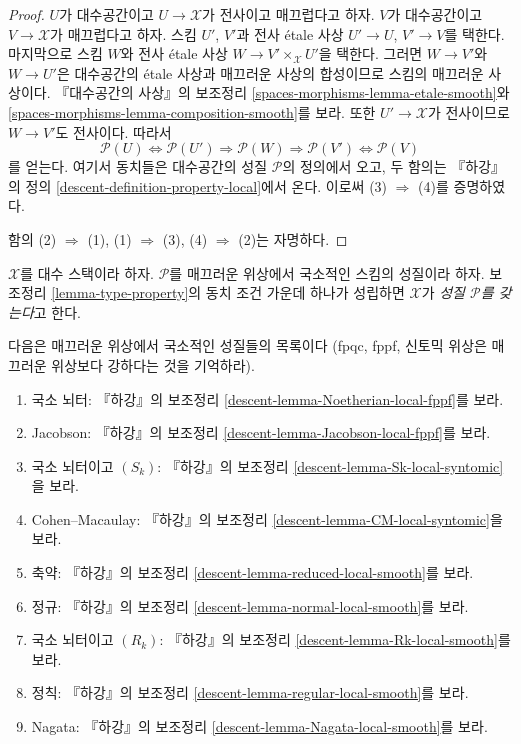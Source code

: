 \begin{proof}
$U$가 대수공간이고 $U \to \mathcal{X}$가 전사이고 매끄럽다고 하자.
$V$가 대수공간이고 $V \to \mathcal{X}$가 매끄럽다고 하자.
스킴 $U'$, $V'$과 전사 \'etale 사상
$U' \to U$, $V' \to V$를 택한다. 마지막으로 스킴 $W$와 전사
\'etale 사상 $W \to V' \times_\mathcal{X} U'$을 택한다.
그러면 $W \to V'$와 $W \to U'$은 대수공간의 \'etale 사상과
매끄러운 사상의 합성이므로 스킴의 매끄러운 사상이다.
『대수공간의 사상』의 보조정리
\ref{spaces-morphisms-lemma-etale-smooth}와
\ref{spaces-morphisms-lemma-composition-smooth}를 보라.
또한 $U' \to \mathcal{X}$가 전사이므로 $W \to V'$도 전사이다.
따라서
$$
\mathcal{P}(U) \Leftrightarrow
\mathcal{P}(U') \Rightarrow
\mathcal{P}(W) \Rightarrow
\mathcal{P}(V') \Leftrightarrow \mathcal{P}(V)
$$
를 얻는다. 여기서 동치들은 대수공간의 성질 $\mathcal{P}$의 정의에서
오고, 두 함의는 『하강』의 정의
\ref{descent-definition-property-local}에서 온다.
이로써 (3) $\Rightarrow$ (4)를 증명하였다.

\medskip\noindent
함의 (2) $\Rightarrow$ (1), (1) $\Rightarrow$ (3),
(4) $\Rightarrow$ (2)는 자명하다.
\end{proof}

\begin{definition}
\label{definition-type-property}
$\mathcal{X}$를 대수 스택이라 하자.
$\mathcal{P}$를 매끄러운 위상에서 국소적인 스킴의 성질이라 하자.
보조정리 \ref{lemma-type-property}의 동치 조건 가운데 하나가 성립하면
$\mathcal{X}$가 {\it 성질 $\mathcal{P}$를 갖는다}고 한다.
\end{definition}

\begin{remark}
\label{remark-list-properties-local-smooth-topology}
다음은 매끄러운 위상에서 국소적인 성질들의 목록이다
(fpqc, fppf, 신토믹 위상은 매끄러운 위상보다 강하다는 것을 기억하라).
\begin{enumerate}
\item 국소 뇌터: 『하강』의 보조정리
\ref{descent-lemma-Noetherian-local-fppf}를 보라.
\item Jacobson: 『하강』의 보조정리
\ref{descent-lemma-Jacobson-local-fppf}를 보라.
\item 국소 뇌터이고 $(S_k)$: 『하강』의 보조정리
\ref{descent-lemma-Sk-local-syntomic}을 보라.
\item Cohen--Macaulay: 『하강』의 보조정리
\ref{descent-lemma-CM-local-syntomic}을 보라.
\item 축약: 『하강』의 보조정리
\ref{descent-lemma-reduced-local-smooth}를 보라.
\item 정규: 『하강』의 보조정리
\ref{descent-lemma-normal-local-smooth}를 보라.
\item 국소 뇌터이고 $(R_k)$: 『하강』의 보조정리
\ref{descent-lemma-Rk-local-smooth}를 보라.
\item 정칙: 『하강』의 보조정리
\ref{descent-lemma-regular-local-smooth}를 보라.
\item Nagata: 『하강』의 보조정리
\ref{descent-lemma-Nagata-local-smooth}를 보라.
\end{enumerate}
\end{remark}

